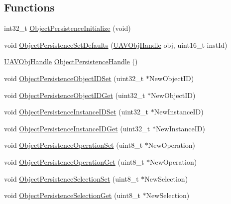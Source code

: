 \subsection*{\-Functions}
\begin{DoxyCompactItemize}
\item 
int32\-\_\-t \hyperlink{group___object_persistence_ga9d97062ec590552ff7687aa4c86dd9b8}{\-Object\-Persistence\-Initialize} (void)
\item 
void \hyperlink{group___object_persistence_ga9bbba671d41288ea39ce6ad424ce69d0}{\-Object\-Persistence\-Set\-Defaults} (\hyperlink{targets_2_u_a_v_objects_2inc_2uavobjectmanager_8h_a279053e22be53ce9f895043aaeb91e3b}{\-U\-A\-V\-Obj\-Handle} obj, uint16\-\_\-t inst\-Id)
\item 
\hyperlink{targets_2_u_a_v_objects_2inc_2uavobjectmanager_8h_a279053e22be53ce9f895043aaeb91e3b}{\-U\-A\-V\-Obj\-Handle} \hyperlink{group___object_persistence_ga26bb77a0f099ac996d046a03b2dfe6f5}{\-Object\-Persistence\-Handle} ()
\item 
void \hyperlink{group___object_persistence_gaaeb3cc845b4b3bab135c47b7dd6396a1}{\-Object\-Persistence\-Object\-I\-D\-Set} (uint32\-\_\-t $\ast$\-New\-Object\-I\-D)
\item 
void \hyperlink{group___object_persistence_ga0e406d18ea13c76a157e6c071d98824f}{\-Object\-Persistence\-Object\-I\-D\-Get} (uint32\-\_\-t $\ast$\-New\-Object\-I\-D)
\item 
void \hyperlink{group___object_persistence_ga791024f997c37df817edac153f333daa}{\-Object\-Persistence\-Instance\-I\-D\-Set} (uint32\-\_\-t $\ast$\-New\-Instance\-I\-D)
\item 
void \hyperlink{group___object_persistence_gae4c7fd386abde02cb072292e1aa95f22}{\-Object\-Persistence\-Instance\-I\-D\-Get} (uint32\-\_\-t $\ast$\-New\-Instance\-I\-D)
\item 
void \hyperlink{group___object_persistence_gaa23f80ca6cc1e09944d0da1ef6ad2ccb}{\-Object\-Persistence\-Operation\-Set} (uint8\-\_\-t $\ast$\-New\-Operation)
\item 
void \hyperlink{group___object_persistence_ga97ef58b3b303266920044a177a4a7117}{\-Object\-Persistence\-Operation\-Get} (uint8\-\_\-t $\ast$\-New\-Operation)
\item 
void \hyperlink{group___object_persistence_gab61d7f5c966dfa3e6588249d4b141973}{\-Object\-Persistence\-Selection\-Set} (uint8\-\_\-t $\ast$\-New\-Selection)
\item 
void \hyperlink{group___object_persistence_ga9bcae21a4a0be442af52c311e16ac8bc}{\-Object\-Persistence\-Selection\-Get} (uint8\-\_\-t $\ast$\-New\-Selection)
\end{DoxyCompactItemize}


